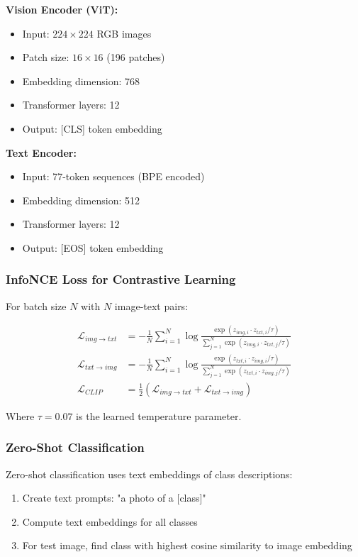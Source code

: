 \documentclass[conference]{IEEEtran}
\begin{document}
\textbf{Vision Encoder (ViT):}
\begin{itemize}
  \item Input: $224 \times 224$ RGB images
  \item Patch size: $16 \times 16$ (196 patches)
  \item Embedding dimension: 768
  \item Transformer layers: 12
  \item Output: [CLS] token embedding
\end{itemize}

\textbf{Text Encoder:}
\begin{itemize}
  \item Input: 77-token sequences (BPE encoded)
  \item Embedding dimension: 512
  \item Transformer layers: 12
  \item Output: [EOS] token embedding
\end{itemize}

\subsubsection{InfoNCE Loss for Contrastive Learning}
\label{sec:q1_clip_loss}

For batch size $N$ with $N$ image-text pairs:

\begin{align}
\mathcal{L}_{img \to txt} &= -\frac{1}{N} \sum_{i=1}^{N} \log \frac{\exp(z_{img,i} \cdot z_{txt,i} / \tau)}{\sum_{j=1}^{N} \exp(z_{img,i} \cdot z_{txt,j} / \tau)} \\
\mathcal{L}_{txt \to img} &= -\frac{1}{N} \sum_{i=1}^{N} \log \frac{\exp(z_{txt,i} \cdot z_{img,i} / \tau)}{\sum_{j=1}^{N} \exp(z_{txt,i} \cdot z_{img,j} / \tau)} \\
\mathcal{L}_{CLIP} &= \frac{1}{2} (\mathcal{L}_{img \to txt} + \mathcal{L}_{txt \to img})
\end{align}

Where $\tau = 0.07$ is the learned temperature parameter.

\subsubsection{Zero-Shot Classification}
\label{sec:q1_clip_zero_shot}

Zero-shot classification uses text embeddings of class descriptions:

\begin{enumerate}
  \item Create text prompts: "a photo of a [class]"
  \item Compute text embeddings for all classes
  \item For test image, find class with highest cosine similarity to image embedding
\end{enumerate}
\end{document}

